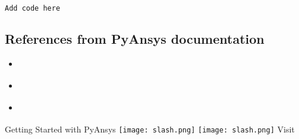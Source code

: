 \documentclass[9pt,landscape]{article}
\begin{document}
\begin{multicols}{3}
\begin{lstlisting}[language=Python]
Add code here

\end{lstlisting}


\subsection{References from PyAnsys documentation}
\begin{itemize}
\item \href{usefullinks}{\color{blue}{name of link}}
\item \href{useful_links}{\color{blue}{name of link}}
\item \href{useful_links}{\color{blue}{name of link}}
\end{itemize}
\end{multicols}

\vspace{-0.15cm}
\noindent\makebox[\linewidth]{\rule{\paperwidth}{4pt}}
\begin{center}
Getting Started with PyAnsys \texttt{[image: slash.png]} \href{https://github.com/pyansys}{\color{blue}{PyAnsys on GitHub}} \texttt{[image: slash.png]} Visit 
\end{center}
\end{document}
